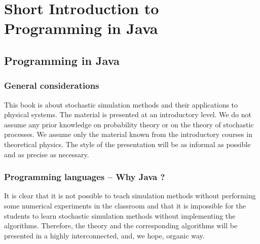 
\chapter{Short Introduction to Programming in Java}
\label{chap:IntroJava}

\section{Programming in Java}
\label{sec:Programming}


\subsection{General considerations}
\label{sec:General_considerations}
This book is about stochastic simulation methods and their applications to
physical systems. The material is presented at an introductory level. We do 
not assume any prior knowledge on probability theory or on the theory of 
stochastic processes. We assume only the material known from the introductory 
courses in theoretical physics. The style of the presentation will be as 
informal as possible and as precise as necessary.



\subsection{Programming languages -- Why Java ?}
\label{sec:Programming_languages}
It is clear that it is not possible to teach simulation methods without 
performing some numerical experiments in the classroom and that it is 
impossible for the students to learn stochastic simulation methods without 
implementing the algorithms. Therefore, the theory and the corresponding 
algorithms will be presented in a highly interconnected, and, we 
hope, organic way.

